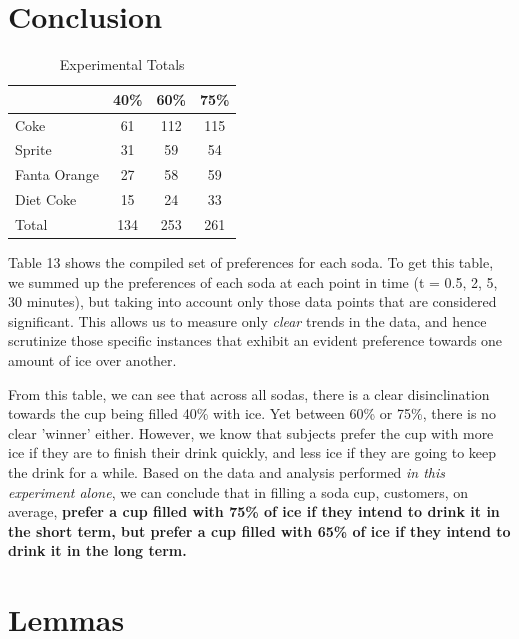 \documentclass[oneside,12pt]{report}
\def\prefacesection#1{
\chapter*{#1}
\addcontentsline{toc}{chapter}{#1}
}
\begin{document}
%

\prefacesection{Conclusion}

\begin{table}[ h]
\centering
\begin{tabular}{ l || c|c|c }
  &40\% &60\% & 75\%  \\
\hline  
Coke & 61 & 112 & 115 \\
\hline  
Sprite & 31& 59 & 54 \\
\hline  
Fanta Orange & 27 & 58 & 59 \\ 
\hline  
Diet Coke & 15 & 24& 33 \\ 
\hline  
Total & 134 & 253 & 261  \\ 
\hline     
 \end{tabular}
\caption{Experimental Totals}
\end{table}


\vspace{24pt}
Table 13 shows the compiled set of preferences for each soda. To get this table,  we summed up the preferences of each soda at each point in time (t = 0.5, 2, 5, 30 minutes), but taking into account only those data points that are considered significant. This allows us to measure only \emph{clear} trends in the data, and hence scrutinize those specific instances that exhibit an evident preference towards one amount of ice over another. 

\vspace{12pt}
From this table, we can see that across all sodas, there is a clear disinclination towards the cup being filled 40\% with ice. Yet between 60\% or 75\%, there is no clear 'winner' either. However, we know that subjects prefer the cup with more ice if they are to finish their drink quickly, and less ice if they are going to keep the drink for a while. Based on the data and analysis performed \emph{in this experiment alone}, we can conclude that in filling a soda cup, customers, on average, \bf{ prefer a cup filled with 75\% of ice if they intend to drink it in the short term, but prefer a cup filled with 65\% of ice if they intend to drink it in the long term. }

%
%
%
%
%
%


\appendix
{}

\chapter{Lemmas}\label{Lemma}
\vspace{12pt} 
\end{document}
